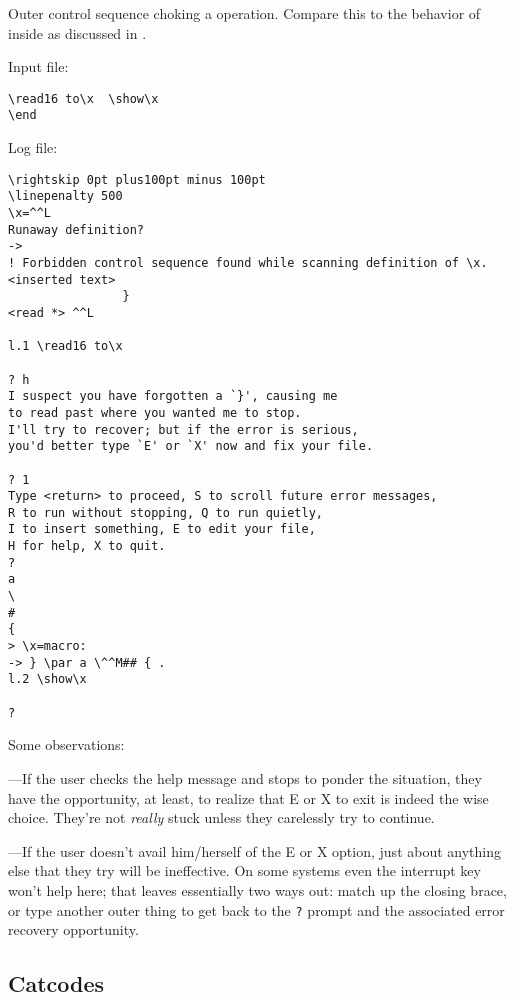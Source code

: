 {\begin{example}
\begin{examplebox}
\caption[]{Outer control sequence choking a  operation. Compare
this to the behavior of  inside  as discussed in .}
\label{ex:outerread}%
Input file:
\begin{verbatim}
\read16 to\x  \show\x
\end
\end{verbatim}

Log file:
\def\next{\begin{verbatim}\rightskip0pt plus100pt minus 100pt
\linepenalty 500 }
\next
\x=^^L
Runaway definition?
->
! Forbidden control sequence found while scanning definition of \x.
<inserted text>
                }
<read *> ^^L

l.1 \read16 to\x

? h
I suspect you have forgotten a `}', causing me
to read past where you wanted me to stop.
I'll try to recover; but if the error is serious,
you'd better type `E' or `X' now and fix your file.

? 1
Type <return> to proceed, S to scroll future error messages,
R to run without stopping, Q to run quietly,
I to insert something, E to edit your file,
H for help, X to quit.
?
a
\
#
{
> \x=macro:
-> } \par a \^^M## { .
l.2 \show\x

?
\end{verbatim}

\end{examplebox}
\end{example}

Some observations:

---If the user checks the help message and stops to ponder the
situation, they have the opportunity, at least, to realize that E or
X to exit is indeed the wise choice. They're not {\em really\/}
stuck unless they carelessly try to continue.

---If the user doesn't avail him/herself of the E or X option, just
about anything else that they try will be ineffective. On some
systems even the interrupt key won't help here; that leaves
essentially two ways out: match up the closing brace, or type another
outer thing to get back to the \verb;?; prompt and the associated
error recovery opportunity.


\subsection{Catcodes}

}

